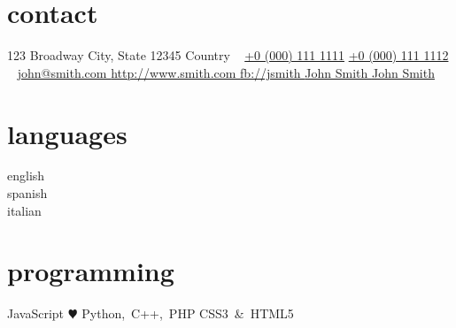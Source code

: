 \documentclass[]{friggeri-cv-a4}
\begin{document}


\begin{aside} %
\section{contact}
123 Broadway
City, State 12345
Country
~
\href{+00001111111}{+0 (000) 111 1111}
\href{+00001111112}{+0 (000) 111 1112}
~
\href{mailto:john@smith.com}{\footnotesize john@smith.com \envelope}
\href{http://www.smith.com}{\footnotesize http://www.smith.com \globe}
\href{http://facebook.com/johnsmith}{\footnotesize fb://jsmith \facebook}
\href{https://www.xing.com/profile/John\_Smith}{\footnotesize John Smith \xing}
\href{https://www.linkedin.com/in/john-smith-123456789}{\footnotesize John Smith \linkedin}
\section{languages}
\begin{footnotesize} english \starsolid\starsolid\starsolid\starsolid\starsolid\\ %
spanish \starsolid\starsolid\starsolid\starsolid\starempty\\ %
italian \starsolid\starsolid\starempty\starempty\starempty %
\end{footnotesize}
\section{programming}
\begin{footnotesize} JavaScript {\color{red} $\varheartsuit$}
\mbox{Python, C++, PHP\hspace{0.3cm}}
\mbox{CSS3 \& HTML5\hspace{0.3cm}}
\end{footnotesize}
\end{aside}

\end{document}
